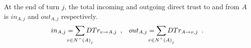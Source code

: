 \begin{definition}
\label{inouttrust}
  At the end of turn $j$, the total incoming and outgoing direct trust to and from $A$ is $in_{A, j}$ and $out_{A, j}$
  respectively.
  \begin{align}
    in_{A, j} = \sum\limits_{\mathclap{v \in N^{-}\left(A\right)_j}}DTr_{v \rightarrow A, j} \enspace, &&
    out_{A, j} = \sum\limits_{\mathclap{v \in N^{+}\left(A\right)_j}}DTr_{A \rightarrow v, j} \enspace.
  \end{align}
\end{definition}
